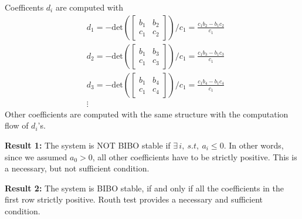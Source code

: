 \documentclass[twoside]{article}
\begin{document}
Coefficents $d_i$ are computed with
%
\begin{align*}
& d_1 = - \mathrm{det}\left( \left[ \begin{array}{cc} b_1 & b_2 \\ 
                                      c_1 & c_2 \end{array}
                                                           \right]
                                                           \right) /c_1
=
\frac{c_1 b_2 - b_1 c_2 }{c_1}
\\
&d_2 = - \mathrm{det}\left( \left[ \begin{array}{cc} b_1 & b_3 \\ c_1
                                                         &
                                                           c_3 \end{array}
                                                           \right]
                                                           \right) / c_1
=
\frac{c_1 b_3 - b_1 c_3 }{c_1}
\\
&d_3 = - \mathrm{det}\left( \left[ \begin{array}{cc} b_1 & b_4 \\ c_1
                                                         &
                                                           c_4 \end{array}
                                                           \right]
                                                           \right) / c_1
=
\frac{c_1 b_4 - b_1 c_4 }{c_1}
\\
&\vdots
\end{align*}  
%
Other coefficients are computed with the same structure with the
computation flow of $d_i$'s. 

\textbf{Result 1:} The system is NOT BIBO stable if $\exists \, i , \ s.t ,\
a_i \leq 0 $. In other words, since we assumed $a_0 > 0$, all other
coefficients have to be strictly positive. This is a necessary, but
not sufficient condition. 

\textbf{Result 2:} The system is BIBO stable, if and only if all the 
coefficients in the first row strictly positive. Routh test provides
a necessary and sufficient condition.  
\end{document}
